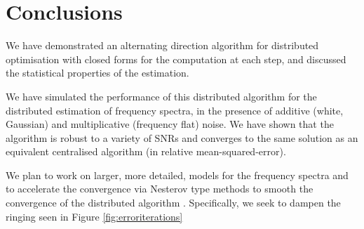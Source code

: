 \documentclass{article}
\begin{document}
\section{Conclusions}
We have demonstrated an alternating direction algorithm for distributed optimisation with closed forms for the computation at each step, and discussed the statistical properties of the estimation. 

We have simulated the performance of this distributed algorithm for the distributed estimation of frequency spectra, in the presence of additive (white, Gaussian) and multiplicative (frequency flat) noise. We have shown that the algorithm is robust to a variety of SNRs and converges to the same solution as an equivalent centralised algorithm (in relative mean-squared-error).

We plan to work on larger, more detailed, models for the frequency spectra and to accelerate the convergence via Nesterov type methods to smooth the convergence of the distributed algorithm \cite{goldstein2014fast}. Specifically, we seek to dampen the ringing seen in Figure \ref{fig:erroriterations}


\end{document}
